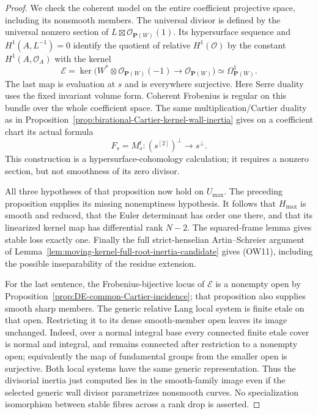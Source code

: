 \begin{proof}
We check the coherent model on the entire coefficient projective
space, including its nonsmooth members.  The universal divisor is
defined by the universal nonzero section of
\(L\boxtimes\mathcal O_{\mathbf P(W)}(1)\).  Its hypersurface
sequence and \(H^1(A,L^{-1})=0\) identify the quotient of relative
\(H^1(\mathcal O)\) by the constant \(H^1(A,\mathcal O_A)\) with
the kernel
\[
 \mathcal E=
 \ker\bigl(W^*\otimes\mathcal O_{\mathbf P(W)}(-1)
                      \longrightarrow\mathcal O_{\mathbf P(W)}\bigr)
 \simeq\Omega^1_{\mathbf P(W)}.
 \tag{OW12}
\]
The last map is evaluation at \(s\) and is everywhere surjective.
Here Serre duality uses the fixed invariant volume form.  Coherent
Frobenius is regular on this bundle over the whole coefficient space.
The same multiplication/Cartier duality as in
Proposition~\ref{prop:birational-Cartier-kernel-wall-inertia}
gives on a coefficient chart its actual formula
\[
 F_s=M_s^t:(s^{[2]})^\perp\longrightarrow s^\perp.
 \tag{OW13}
\]
This construction is a hypersurface-cohomology calculation; it
requires a nonzero section, but not smoothness of its zero divisor.

All three hypotheses of that proposition now hold on \(U_{\max}\).
The preceding proposition supplies its missing nonemptiness
hypothesis.  It follows that \(H_{\max}\) is smooth and reduced,
that the Euler determinant has order one there, and that its
linearized kernel map has differential rank \(N-2\).  The squared-frame
lemma gives stable loss exactly one.  Finally the full
strict-henselian Artin--Schreier argument of
Lemma~\ref{lem:moving-kernel-full-root-inertia-candidate} gives
(OW11), including the possible inseparability of the residue extension.

For the last sentence, the Frobenius-bijective locus of \(\mathcal E\)
is a nonempty open by
Proposition~\ref{prop:DE-common-Cartier-incidence}; that proposition
also supplies smooth sharp members.  The generic relative Lang
local system is finite etale on that open.  Restricting it to its
dense smooth-member open leaves its image unchanged.  Indeed, over
a normal integral base every connected finite etale cover is
normal and integral, and remains connected after restriction to a
nonempty open; equivalently the map of fundamental groups from
the smaller open is surjective.  Both local systems have the same
generic representation.  Thus the divisorial inertia just computed
lies in the smooth-family image even if the selected generic wall
divisor parametrizes nonsmooth curves.  No specialization isomorphism
between stable fibres across a rank drop is asserted.
\end{proof}

